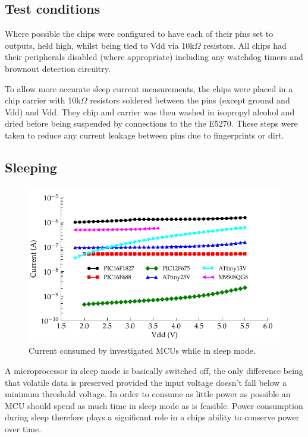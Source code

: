\subsection{Test conditions}

Where possible the chips were configured to have each of their pins
set to outputs, held high, whilst being tied to Vdd via 10k$\Omega$
resistors. All chips had their peripherals disabled (where appropriate)
including any watchdog timers and brownout detection circuitry.

To allow more accurate sleep current measurements, the chips were
placed in a chip carrier with 10k$\Omega$ resistors soldered between
the pins (except ground and Vdd) and Vdd. They chip and carrier was
then washed in isopropyl alcohol and dried before being suspended
by connections to the the E5270. These steps were taken to reduce
any current leakage between pins due to fingerprints or dirt.


\subsection{Sleeping}

\begin{figure}
\begin{centering}
\includegraphics{content/pt1/02-Microcontrollers/graphics/Graph_All_Sleeping_Current}
\par\end{centering}

\centering{}\protect\caption{\label{fig:All_Sleep_Current}Current consumed by investigated MCUs
while in sleep mode.}
\end{figure}


A microprocessor in sleep mode is basically switched off, the only
difference being that volatile data is preserved provided the input
voltage doesn't fall below a minimum threshold voltage. In order to
consume as little power as possible an MCU should spend as much time
in sleep mode as is feasible. Power consumption during sleep therefore
plays a significant role in a chips ability to conserve power over
time.

